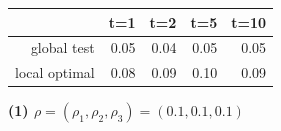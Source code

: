 \documentclass[12pt]{report}
\begin{document}
\begin{table}[ht]
\centering
\begin{tabular}{rrrrr}
  \hline
 & t=1 & t=2 & t=5 & t=10 \\ 
  \hline
global test & 0.05 & 0.04 & 0.05 & 0.05 \\ 
  local optimal & 0.08 & 0.09 & 0.10 & 0.09 \\ 
   \hline
\end{tabular}
\end{table}




\newpage
\textbf{(1) $\rho = (\rho_{1}, \rho_{2}, \rho_{3}) = (0.1, 0.1, 0.1)$}

\begin{figure}[H]
\captionsetup{format=plain}
\centering
{}

\end{figure}
\end{document}

